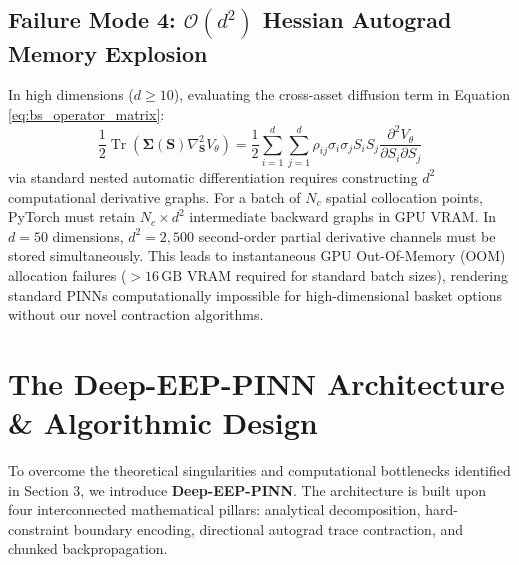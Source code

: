 \documentclass[11pt,a4paper]{article}
\begin{document}
\subsection{Failure Mode 4: \texorpdfstring{$\mathcal{O}(d^2)$}{O(d\textasciicircum 2)} Hessian Autograd Memory Explosion}
In high dimensions ($d \ge 10$), evaluating the cross-asset diffusion term in Equation \eqref{eq:bs_operator_matrix}:
\begin{equation}
\label{eq:cross_diffusion_sum}
\frac{1}{2} \operatorname{Tr}\left( \boldsymbol{\Sigma}(\mathbf{S}) \nabla^2_{\mathbf{S}} V_\theta \right) = \frac{1}{2} \sum_{i=1}^d \sum_{j=1}^d \rho_{ij} \sigma_i \sigma_j S_i S_j \frac{\partial^2 V_\theta}{\partial S_i \partial S_j}
\end{equation}
via standard nested automatic differentiation requires constructing $d^2$ computational derivative graphs. For a batch of $N_c$ spatial collocation points, PyTorch must retain $N_c \times d^2$ intermediate backward graphs in GPU VRAM. In $d=50$ dimensions, $d^2 = 2,500$ second-order partial derivative channels must be stored simultaneously. This leads to instantaneous GPU Out-Of-Memory (OOM) allocation failures ($> 16\,\text{GB}$ VRAM required for standard batch sizes), rendering standard PINNs computationally impossible for high-dimensional basket options without our novel contraction algorithms.

\section{The Deep-EEP-PINN Architecture \& Algorithmic Design}

To overcome the theoretical singularities and computational bottlenecks identified in Section 3, we introduce \textbf{Deep-EEP-PINN}. The architecture is built upon four interconnected mathematical pillars: analytical decomposition, hard-constraint boundary encoding, directional autograd trace contraction, and chunked backpropagation.
\end{document}
